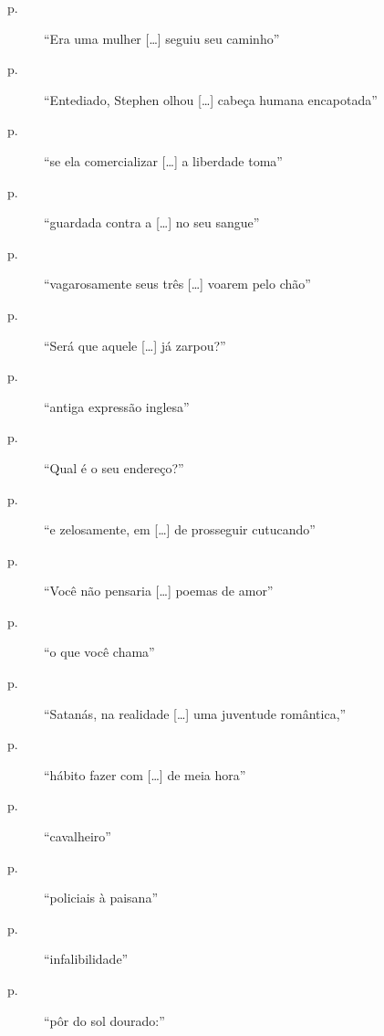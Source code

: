 \begin{description}
\item[p.~\pageref{era"-uma}]  ``Era uma mulher [\ldots] seguiu seu caminho''

\item[p.~\pageref{entediado"-stephen}]  ``Entediado, Stephen olhou [\ldots] cabeça humana encapotada''

\item[p.~\pageref{se"-ela}]  ``se ela comercializar [\ldots] a liberdade toma''

\item[p.~\pageref{guardada"-contra}]  ``guardada contra a [\ldots] no seu sangue''

\item[p.~\pageref{vagarosamente"-seus}]  ``vagarosamente seus três [\ldots] voarem pelo chão''

\item[p.~\pageref{sera"-que}]  ``Será que aquele [\ldots] já zarpou?''

\item[p.~\pageref{antiga"-expressao}]  ``antiga expressão inglesa''

\item[p.~\pageref{qual"-e}]  ``Qual é o seu endereço?''

\item[p.~\pageref{e"-zelosamente}]  ``e zelosamente, em [\ldots] de prosseguir cutucando''

\item[p.~\pageref{voce"-nao"-pensaria}]  ``Você não pensaria [\ldots] poemas de amor''

\item[p.~\pageref{o"-que}]  ``o que você chama''

\item[p.~\pageref{satanas"-na}]  ``Satanás, na realidade [\ldots] uma juventude romântica,''

\item[p.~\pageref{habito"-fazer}]  ``hábito fazer com [\ldots] de meia hora''

\item[p.~\pageref{cavalheiro}]  ``cavalheiro''

\item[p.~\pageref{policiais"-a}]  ``policiais à paisana''

\item[p.~\pageref{infalibilidade}]  ``infalibilidade''

\item[p.~\pageref{por"-do}]  ``pôr do sol dourado:''

\end{description}


